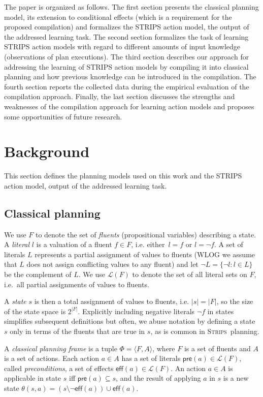 \documentclass[letterpaper]{article} %
\newcommand{\tup}[1]{{\langle #1 \rangle}}
\newcommand{\pre}{\mathsf{pre}}     %
\newcommand{\eff}{\mathsf{eff}}     %
\newcommand{\strips}{\textsc{Strips}}     %
\begin{document}
The paper is organized as follows. The first section presents the classical planning model, its extension to conditional effects (which is a requirement for the proposed compilation) and formalizes the STRIPS action model, the output of the addressed learning task. The second section formalizes the task of learning STRIPS action models with regard to different amounts of input knowledge (observations of plan executions). The third section describes our approach for addressing the learning of STRIPS action models by compiling it into classical planning and how previous knowledge can be introduced in the compilation. The fourth section reports the collected data during the empirical evaluation of the compilation approach. Finally, the last section discusses the strengths and weaknesses of the compilation approach for learning action models and proposes some opportunities of future research. 
 

\section{Background}
This section defines the planning models used on this work and the STRIPS action model, output of the addressed learning task.

\subsection{Classical planning}
We use $F$ to denote the set of {\em fluents} (propositional variables) describing a state. A {\em literal} $l$ is a valuation of a fluent $f\in F$, i.e. either~$l=f$ or $l=\neg f$. A set of literals $L$ represents a partial assignment of values to fluents (WLOG we assume that $L$ does not assign conflicting values to any fluent) and let $\neg L=\{\neg l:l\in L\}$ be the complement of $L$. We use $\mathcal{L}(F)$ to denote the set of all literal sets on $F$, i.e.~all partial assignments of values to fluents.

A {\em state} $s$ is then a total assignment of values to fluents, i.e. $|s|=|F|$, so the size of the state space is $2^{|F|}$. Explicitly including negative literals $\neg f$ in states simplifies subsequent definitions but often, we abuse notation by defining a state $s$ only in terms of the fluents that are true in $s$, as is common in \strips\ planning.

A {\em classical planning frame} is a tuple $\Phi=\tup{F,A}$, where $F$ is a set of fluents and $A$ is a set of actions. Each action $a\in A$ has a set of literals $\pre(a)\in\mathcal{L}(F)$, called {\em preconditions}, a set of effects $\eff(a)\in\mathcal{L}(F)$. An action $a\in A$ is applicable in state $s$ iff $\pre(a)\subseteq s$, and the result of applying $a$ in $s$ is a new state $\theta(s,a)=(s\setminus \neg\eff(a))\cup\eff(a)$.
\end{document}

